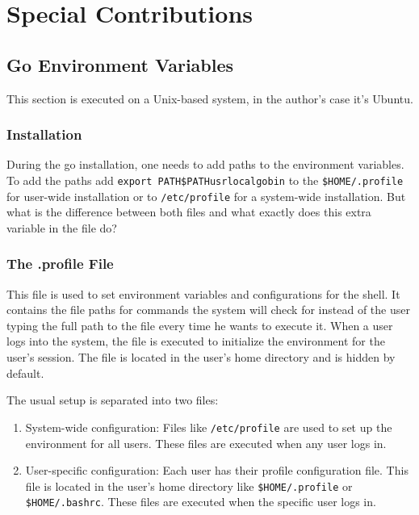 \chapter{Special Contributions}
\label{ch:special_contributions}

\section{Go Environment Variables}
\label{sec:go_environment_variables}
This section is executed on a Unix-based system, in the author's case it's Ubuntu.

\subsection{Installation}
During the go installation, one needs to add paths to the environment variables.
To add the paths add \texttt{export PATH\=\$PATH\:\/usr\/local\/go\/bin} 
to the \texttt{\$HOME/.profile} for user-wide installation or to \texttt{/etc/profile} for a system-wide installation.
But what is the difference between both files and what exactly does this extra variable in the file do?

\subsection{The .profile File}
This file is used to set environment variables and configurations for the shell.
It contains the file paths for commands the system will check for instead of the user typing the full path to the file every time he wants to execute it.
When a user logs into the system, the file is executed to initialize the environment for the user's session.
The file is located in the user's home directory and is hidden by default.

The usual setup is separated into two files:
\begin{enumerate}
    \item System-wide configuration:
        Files like \texttt{/etc/profile} are used to set up the environment for all users.
        These files are executed when any user logs in.
    \item User-specific configuration:
        Each user has their profile configuration file.
        This file is located in the user's home directory like \texttt{\$HOME/.profile} or \texttt{\$HOME/.bashrc}.
        These files are executed when the specific user logs in.
\end{enumerate}

